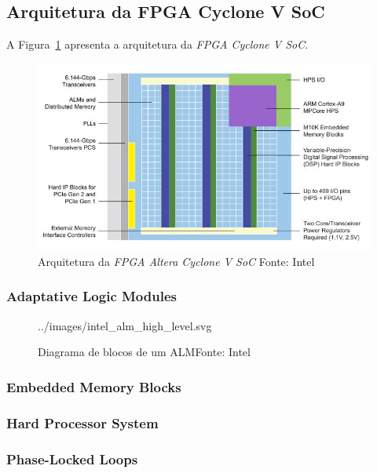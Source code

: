     \subsection{Arquitetura da FPGA Cyclone V SoC}
    {
        A Figura~\ref{fig:cyclone_v_arch} apresenta a arquitetura da
        \textit{FPGA Cyclone V SoC}.
    }

    \begin{figure}[H]
    \centering
    \includegraphics[width=1\linewidth]
        {../images/altera_cyclone_v_soc_architectural_downscale.jpg}
        \caption[Arquitetura da FPGA Intel Cyclone V SoC]
            {Arquitetura da \textit{FPGA Altera Cyclone V SoC} \quad Fonte: Intel}
        \label{fig:cyclone_v_arch}
    \end{figure}

        \subsubsection{Adaptative Logic Modules}
        {}

        \begin{figure}[H]
        \centering
        
            {../images/intel_alm_high_level.svg}
            \caption[Diagrama de blocos de um ALM]
                {Diagrama de blocos de um ALM\quad Fonte: Intel}
            \label{fig:fpga_alm}
        \end{figure}


        \subsubsection{Embedded Memory Blocks}
        {}

        \subsubsection{Hard Processor System}
        {}

        \subsubsection{Phase-Locked Loops}
        {}

